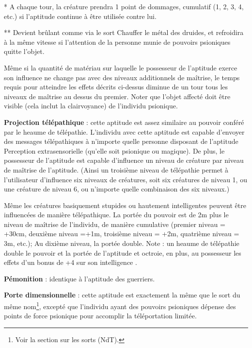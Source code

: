 \documentclass[11pt]{article}
\begin{document}
{\bigskip

* A chaque tour, la créature prendra 1 point de dommages, cumulatif (1, 2, 3, 4, etc.) si l'aptitude continue à être utilisée contre lui.

\bigskip

** Devient brûlant comme via le sort Chauffer le métal des druides, et refroidira à la même vitesse si l'attention de la personne munie de pouvoirs psioniques quitte l'objet.

\bigskip

Même si la quantité de matériau sur laquelle le possesseur de l'aptitude exerce son influence ne change pas avec des niveaux additionnels de maîtrise, le temps requis pour atteindre les effets décrits ci-dessus diminue de un tour tous les niveaux de maîtrise au dessus du premier. Noter que l'objet affecté doit être visible (cela inclut la clairvoyance) de l'individu psionique.

\bigskip

\textbf{Projection télépathique} : cette aptitude est assez similaire au pouvoir conféré par le heaume de télépathie. L'individu avec cette aptitude est capable d'envoyer des messages télépathiques à n'importe quelle personne  disposant de l'aptitude Perception extrasensorielle (qu'elle soit psionique ou magique). De plus, le possesseur de l'aptitude est capable d'influence un niveau de créature par niveau de maîtrise de l'aptitude. (Ainsi un troisième niveau de télépathie permet à l'utilisateur d'influence six niveaux de créatures, soit six créatures de niveau 1, ou une créature de niveau 6, ou n'importe quelle combinaison des six niveaux.)

\bigskip

Même les créatures basiquement stupides ou hautement intelligentes peuvent être influencées de manière télépathique. La portée du pouvoir est de 2m plus le niveau de maîtrise de l'individu, de manière cumulative (premier niveau = +30cm, deuxième niveau =+1m, troisième niveau = +2m, quatrième niveau = 3m, etc.); Au dixième niveau, la portée double. Note : un heaume de télépathie double le pouvoir et la portée de l'aptitude et octroie, en plus, au possesseur les effets d'un bonus de +4 sur son intelligence .

\bigskip

\textbf{Pémonition} : identique à l'aptitude des guerriers.

\bigskip

\textbf{Porte dimensionnelle} : cette aptitude est exactement la même que le sort du même nom\footnote{Voir la section sur les sorts (NdT).}, excepté que l'individu ayant des pouvoirs psioniques dépense des points de force psionique pour accomplir la téléportation limitée.

}
\end{document}

